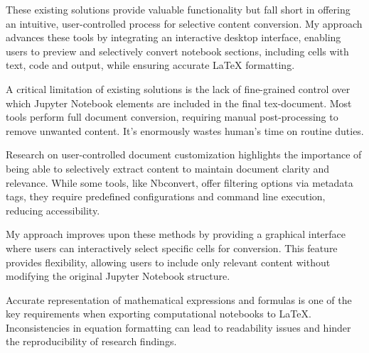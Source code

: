 \documentclass{article}
\begin{document}
\begin{multicols}{2}
These existing solutions provide valuable functionality but fall short in offering an intuitive, user-controlled process for selective content conversion. My approach advances these tools by integrating an interactive desktop interface, enabling users to preview and selectively convert notebook sections, including cells with text, code and output, while ensuring accurate LaTeX formatting.

A critical limitation of existing solutions is the lack of fine-grained control over which Jupyter Notebook elements are included in the final tex-document. Most tools perform full document conversion, requiring manual post-processing to remove unwanted content. It's enormously wastes human's time on routine duties.

Research on user-controlled document customization highlights the importance of being able to selectively extract content to maintain document clarity and relevance. While some tools, like Nbconvert, offer filtering options via metadata tags, they require predefined configurations and command line execution, reducing accessibility.

My approach improves upon these methods by providing a graphical interface where users can interactively select specific cells for conversion. This feature provides flexibility, allowing users to include only relevant content without modifying the original Jupyter Notebook structure.

Accurate representation of mathematical expressions and formulas is one of the key requirements when exporting computational notebooks to LaTeX. Inconsistencies in equation formatting can lead to readability issues and hinder the reproducibility of research findings.


\end{multicols}
\end{document}

